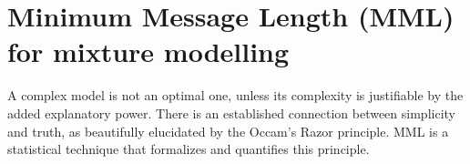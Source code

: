 \documentclass{elsarticle}
\begin{document}


\section{Minimum Message Length (MML) for mixture modelling}
A complex model is not an optimal one, unless its complexity is justifiable by 
the added explanatory power. There is an established connection between 
simplicity and truth, as beautifully elucidated by the Occam's Razor principle. 
MML is a statistical technique that formalizes and quantifies this principle.




\end{document}

